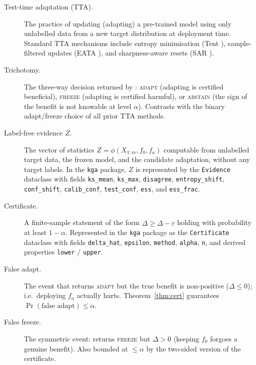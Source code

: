 \begin{description}

\item[Test-time adaptation (TTA).]
  The practice of updating (adapting) a pre-trained model using only unlabelled
  data from a new target distribution at deployment time.  Standard TTA
  mechanisms include entropy minimisation (Tent \cite{wang2021tent}),
  sample-filtered updates (EATA \cite{niu2022eata}), and sharpness-aware resets
  (SAR \cite{niu2023sar}).

\item[Trichotomy.]
  The three-way decision returned by \KGA{}: \textsc{adapt} (adapting is
  certified beneficial), \textsc{freeze} (adapting is certified harmful), or
  \textsc{abstain} (the sign of the benefit is not knowable at level $\alpha$).
  Contrasts with the binary adapt/freeze choice of all prior TTA methods.

\item[Label-free evidence $Z$.]
  The vector of statistics $Z = \phi(X_{1:m}, f_0, f_a)$ computable from
  unlabelled target data, the frozen model, and the candidate adaptation,
  without any target labels.  In the \texttt{kga} package, $Z$ is represented
  by the \texttt{Evidence} dataclass with fields \texttt{ks\_mean},
  \texttt{ks\_max}, \texttt{disagree}, \texttt{entropy\_shift},
  \texttt{conf\_shift}, \texttt{calib\_conf}, \texttt{test\_conf},
  \texttt{ess}, and \texttt{ess\_frac}.

\item[Certificate.]
  A finite-sample statement of the form $\Delta \geq \widehat\Delta - \varepsilon$
  holding with probability at least $1 - \alpha$.  Represented in the \texttt{kga}
  package as the \texttt{Certificate} dataclass with fields \texttt{delta\_hat},
  \texttt{epsilon}, \texttt{method}, \texttt{alpha}, \texttt{n}, and derived
  properties \texttt{lower} / \texttt{upper}.

\item[False adapt.]
  The event that \KGA{} returns \textsc{adapt} but the true benefit is
  non-positive ($\Delta \leq 0$); i.e.\ deploying $f_a$ actually hurts.
  Theorem~\ref{thm:cert} guarantees $\Pr(\text{false adapt}) \leq \alpha$.

\item[False freeze.]
  The symmetric event: \KGA{} returns \textsc{freeze} but $\Delta > 0$ (keeping
  $f_0$ forgoes a genuine benefit).  Also bounded at $\leq \alpha$ by the
  two-sided version of the certificate.


\end{description}
